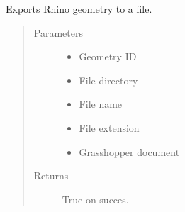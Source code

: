 \documentclass[letterpaper,10pt,english]{sphinxmanual}
\begin{document}

\begin{fulllineitems}
\label{\detokenize{lib:livestock.lib.geometry.export}}
Exports Rhino geometry to a file.
\begin{quote}\begin{description}
\item[{Parameters}] \leavevmode\begin{itemize}
\item {} 
 \textendash{} Geometry ID

\item {} 
 \textendash{} File directory

\item {} 
 \textendash{} File name

\item {} 
 \textendash{} File extension

\item {} 
 \textendash{} Grasshopper document

\end{itemize}

\item[{Returns}] \leavevmode
True on succes.

\end{description}\end{quote}

\end{fulllineitems}

\end{document}

